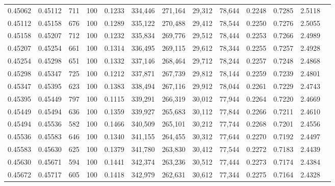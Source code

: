 \begin{tabular}{rrrrrrrrrrrrr}
0.45062 & 0.45112 &   711 & 100 &                                     0.1233 & 334,446 & 271,164 &  29,312 &  78,644 & 0.2248 & 0.7285 & 2.5118 \\
0.45112 & 0.45158 &   676 & 100 &                                     0.1289 & 335,122 & 270,488 &  29,412 &  78,544 & 0.2250 & 0.7276 & 2.5055 \\
0.45158 & 0.45207 &   712 & 100 &                                     0.1232 & 335,834 & 269,776 &  29,512 &  78,444 & 0.2253 & 0.7266 & 2.4989 \\
0.45207 & 0.45254 &   661 & 100 &                                     0.1314 & 336,495 & 269,115 &  29,612 &  78,344 & 0.2255 & 0.7257 & 2.4928 \\
0.45254 & 0.45298 &   651 & 100 &                                     0.1332 & 337,146 & 268,464 &  29,712 &  78,244 & 0.2257 & 0.7248 & 2.4868 \\
0.45298 & 0.45347 &   725 & 100 &                                     0.1212 & 337,871 & 267,739 &  29,812 &  78,144 & 0.2259 & 0.7239 & 2.4801 \\
0.45347 & 0.45395 &   623 & 100 &                                     0.1383 & 338,494 & 267,116 &  29,912 &  78,044 & 0.2261 & 0.7229 & 2.4743 \\
0.45395 & 0.45449 &   797 & 100 &                                     0.1115 & 339,291 & 266,319 &  30,012 &  77,944 & 0.2264 & 0.7220 & 2.4669 \\
0.45449 & 0.45494 &   636 & 100 &                                     0.1359 & 339,927 & 265,683 &  30,112 &  77,844 & 0.2266 & 0.7211 & 2.4610 \\
0.45494 & 0.45536 &   582 & 100 &                                     0.1466 & 340,509 & 265,101 &  30,212 &  77,744 & 0.2268 & 0.7201 & 2.4556 \\
0.45536 & 0.45583 &   646 & 100 &                                     0.1340 & 341,155 & 264,455 &  30,312 &  77,644 & 0.2270 & 0.7192 & 2.4497 \\
0.45583 & 0.45630 &   625 & 100 &                                     0.1379 & 341,780 & 263,830 &  30,412 &  77,544 & 0.2272 & 0.7183 & 2.4439 \\
0.45630 & 0.45671 &   594 & 100 &                                     0.1441 & 342,374 & 263,236 &  30,512 &  77,444 & 0.2273 & 0.7174 & 2.4384 \\
0.45672 & 0.45717 &   605 & 100 &                                     0.1418 & 342,979 & 262,631 &  30,612 &  77,344 & 0.2275 & 0.7164 & 2.4328 \\

\end{tabular}
